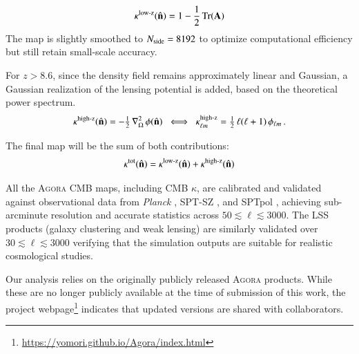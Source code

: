 \documentclass[]{aa} %
\begin{document}
\begin{equation}
\kappa^{\rm low\text{-}z}(\hat{\mathbf{n}}) = 1 - \frac{1}{2}\,\mathrm{Tr}\!\left(\mathbf{A}\right)
\end{equation}
The map is slightly smoothed to $N_{\rm side} = 8192$ to optimize computational efficiency but still retain small-scale accuracy. 

For $z > 8.6$, since the density field remains approximately linear and Gaussian, a Gaussian realization of the lensing potential is added, based on the theoretical power spectrum. 
\begin{equation}
\kappa^{\rm high\text{-}z}(\hat{\mathbf{n}}) 
= -\tfrac{1}{2}\,\nabla^2_{\Omega}\,\phi(\hat{\mathbf{n}})
\;\;\Longleftrightarrow\;\;
\kappa^{\rm high\text{-}z}_{\ell m} 
= \tfrac{1}{2}\,\ell(\ell+1)\,\phi_{\ell m} \, .
\end{equation}

The final map will be the sum of both contributions:
\begin{equation}
\kappa^{\rm tot}(\hat{\mathbf{n}}) = \kappa^{\rm low\text{-}z}(\hat{\mathbf{n}}) + \kappa^{\rm high\text{-}z}(\hat{\mathbf{n}})
\end{equation}

All the \textsc{Agora} CMB maps, including CMB $\kappa$, are calibrated and validated against observational data from \textit{Planck} \citep{planck2006overview}, SPT-SZ \citep{carlstrom2011}, and SPTpol \citep{bleem2012}, achieving sub-arcminute resolution and accurate statistics across $50 \lesssim \ell \lesssim 3000$. The LSS products (galaxy clustering and weak lensing) are similarly validated over $30 \lesssim \ell \lesssim 3000$ verifying that the simulation outputs are suitable for realistic cosmological studies.

Our analysis relies on the originally publicly released \textsc{Agora} products. While these are no longer publicly available at the time of submission of this work, the project webpage\footnote{\url{https://yomori.github.io/Agora/index.html}} indicates that updated versions are shared with collaborators.
\end{document}
